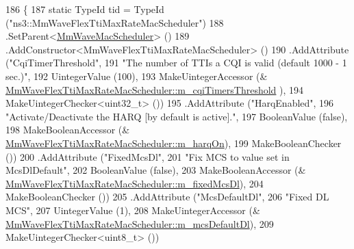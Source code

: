 \begin{DoxyCode}
186 \{
187         \textcolor{keyword}{static} TypeId tid = TypeId (\textcolor{stringliteral}{"ns3::MmWaveFlexTtiMaxRateMacScheduler"})
188             .SetParent<\hyperlink{classns3_1_1MmWaveMacScheduler_aad32d6753e98fe1699402d1a722835c4}{MmWaveMacScheduler}> ()
189                 .AddConstructor<MmWaveFlexTtiMaxRateMacScheduler> ()
190     .AddAttribute (\textcolor{stringliteral}{"CqiTimerThreshold"},
191                    \textcolor{stringliteral}{"The number of TTIs a CQI is valid (default 1000 - 1 sec.)"},
192                    UintegerValue (100),
193                    MakeUintegerAccessor (&
      \hyperlink{classns3_1_1MmWaveFlexTtiMaxRateMacScheduler_a7f29b65f1e4a7c64cf73fe2efd02770f}{MmWaveFlexTtiMaxRateMacScheduler::m\_cqiTimersThreshold}
      ),
194                    MakeUintegerChecker<uint32\_t> ())
195     .AddAttribute (\textcolor{stringliteral}{"HarqEnabled"},
196                    \textcolor{stringliteral}{"Activate/Deactivate the HARQ [by default is active]."},
197                    BooleanValue (\textcolor{keyword}{false}),
198                    MakeBooleanAccessor (&
      \hyperlink{classns3_1_1MmWaveFlexTtiMaxRateMacScheduler_a43dee0cca8dce652c2a2dc750262708e}{MmWaveFlexTtiMaxRateMacScheduler::m\_harqOn}),
199                    MakeBooleanChecker ())
200          .AddAttribute (\textcolor{stringliteral}{"FixedMcsDl"},
201                                                                         \textcolor{stringliteral}{"Fix MCS to value set in
       McsDlDefault"},
202                                                                         BooleanValue (\textcolor{keyword}{false}),
203                                                                         MakeBooleanAccessor (&
      \hyperlink{classns3_1_1MmWaveFlexTtiMaxRateMacScheduler_abcbcedf1b2fef79d0e2d18e25f212880}{MmWaveFlexTtiMaxRateMacScheduler::m\_fixedMcsDl}),
204                                                                         MakeBooleanChecker ())
205         .AddAttribute (\textcolor{stringliteral}{"McsDefaultDl"},
206                                                                  \textcolor{stringliteral}{"Fixed DL MCS"},
207                                                                  UintegerValue (1),
208                                                                  MakeUintegerAccessor (&
      \hyperlink{classns3_1_1MmWaveFlexTtiMaxRateMacScheduler_a10a1c4d21a0a78ebdc57339baf1c4142}{MmWaveFlexTtiMaxRateMacScheduler::m\_mcsDefaultDl}),
209                                                                  MakeUintegerChecker<uint8\_t> ())

\end{DoxyCode}
